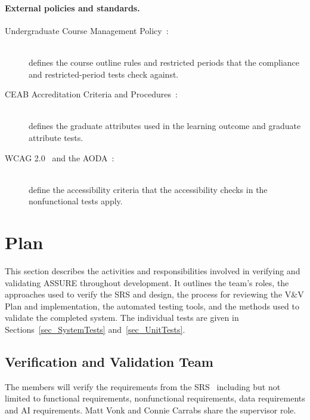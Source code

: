 \documentclass[12pt, titlepage]{article}
\begin{document}
\paragraph{External policies and standards.}
\begin{description}
  \item[Undergraduate Course Management Policy~\citep{McMasterUCMP2025}:]\mbox{}\\
  defines the course outline rules and restricted periods that the
  compliance and restricted-period tests check against.
  \item[CEAB Accreditation Criteria and Procedures~\citep{CEAB2025}:]\mbox{}\\
  defines
  the graduate attributes used in the learning outcome and graduate attribute
  tests.
  \item[WCAG 2.0~\citep{WCAG20} and the AODA~\citep{AODA2005, IASR2011}:]\mbox{}\\
  define the accessibility criteria that the accessibility checks in the
  nonfunctional tests apply.
\end{description}

\section{Plan}

This section describes the activities and responsibilities involved in verifying and validating ASSURE throughout development. It outlines the team's roles, the approaches used to verify the SRS and design, the process for reviewing the V\&V Plan and implementation, the automated testing tools, and the methods used to validate the completed system. The individual tests are given in
Sections~\ref{sec_SystemTests} and~\ref{sec_UnitTests}.


\subsection{Verification and Validation Team}

The members will verify the requirements from the SRS~\citep{TeamBVSH2026SRS} including but not limited to functional requirements, nonfunctional requirements, data requirements and AI requirements. Matt Vonk and Connie Carrabs share the supervisor role.
\end{document}

